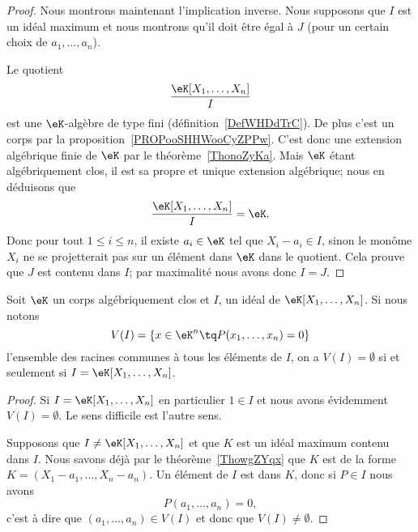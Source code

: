 \begin{proof}
    Nous montrons maintenant l'implication inverse. Nous supposons que \( I\) est un idéal maximum et nous montrons qu'il doit être égal à \( J\) (pour un certain choix de \( a_1,\ldots, a_n\)).

    Le quotient
    \begin{equation}
        \frac{ \eK[X_1,\ldots, X_n] }{ I }
    \end{equation}
    est une \( \eK\)-algèbre de type fini (définition~\ref{DefWHDdTrC}). De plus c'est un corps par la proposition~\ref{PROPooSHHWooCyZPPw}. C'est donc une extension algébrique finie de \( \eK\) par le théorème~\ref{ThonoZyKa}. Mais \( \eK\) étant algébriquement clos, il est sa propre et unique extension algébrique; nous en déduisons que
    \begin{equation}
        \frac{ \eK[X_1,\ldots, X_n] }{ I }=\eK.
    \end{equation}
    Donc pour tout \( 1\leq i\leq n\), il existe \( a_i\in \eK\) tel que \( X_i-a_i\in I\), sinon le monôme \( X_i\) ne se projetterait pas sur un élément dans \( \eK\) dans le quotient. Cela prouve que \( J\) est contenu dans \( I\); par maximalité nous avons donc \( I=J\).
\end{proof}

\begin{corollary}
    Soit \( \eK\) un corps algébriquement clos et \( I\), un idéal de \( \eK[X_1,\ldots, X_n]\). Si nous notons
    \begin{equation}
        V(I)=\{ x\in \eK^n\tq P(x_1,\ldots, x_n)=0 \}
    \end{equation}
    l'ensemble des racines communes à tous les éléments de \( I\), on a \( V(I)=\emptyset\) si et seulement si \( I=\eK[X_1,\ldots, X_n]\).
\end{corollary}

\begin{proof}
    Si \( I=\eK[X_1,\ldots, X_n]\) en particulier \( 1\in I\) et nous avons évidemment \( V(I)=\emptyset\). Le sens difficile est l'autre sens.

    Supposons que \( I\neq \eK[X_1,\ldots, X_n]\) et que \( K\) est un idéal maximum contenu dans \( I\). Nous savons déjà par le théorème~\ref{ThowgZYqx} que \( K\) est de la forme \( K=(X_1-a_1,\ldots, X_n-a_n)\). Un élément de \( I\) est dans \( K\), donc si \( P\in I\) nous avons
    \begin{equation}
        P(a_1,\ldots, a_n)=0,
    \end{equation}
    c'est à dire que \( (a_1,\ldots, a_n)\in V(I)\) et donc que \( V(I)\neq \emptyset \).
\end{proof}


